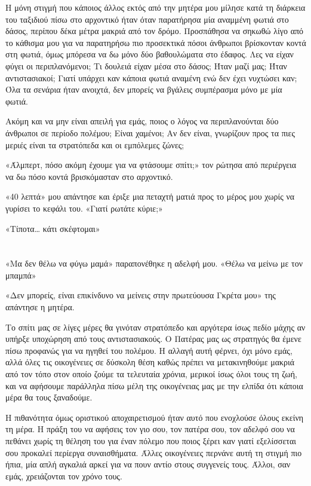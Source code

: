 \documentclass[12pt,twoside, openany]{book}
\begin{document}
Η μόνη στιγμή που κάποιος άλλος εκτός από την μητέρα μου μίλησε κατά τη διάρκεια του ταξιδιού πίσω στο αρχοντικό ήταν όταν παρατήρησα μία αναμμένη φωτιά στο δάσος, περίπου δέκα μέτρα μακριά από τον δρόμο. Προσπάθησα να σηκωθώ λίγο από το κάθισμα μου για να παρατηρήσω πιο προσεκτικά πόσοι άνθρωποι βρίσκονταν κοντά στη φωτιά, όμως μπόρεσα να δω μόνο δύο βαθουλώματα στο έδαφος. Λες να είχαν φύγει οι περιπλανόμενοι; Τι δουλειά είχαν μέσα στο δάσος; Ήταν μαζί μας; Ήταν αντιστασιακοί; Γιατί υπάρχει καν κάποια φωτιά αναμένη ενώ δεν έχει νυχτώσει καν; Όλα τα σενάρια ήταν ανοιχτά, δεν μπορείς να βγάλεις συμπέρασμα μόνο με μία φωτιά.

Ακόμη και να μην είναι απειλή για εμάς, ποιος ο λόγος να περιπλανούνται δύο άνθρωποι σε περίοδο πολέμου; Είναι χαμένοι; Αν δεν είναι, γνωρίζουν προς τα πιες μεριές είναι τα στρατόπεδα και οι εμπόλεμες ζώνες; 

«Άλμπερτ, πόσο ακόμη έχουμε για να φτάσουμε σπίτι;» τον ρώτησα από περιέργεια να δω πόσο κοντά βρισκόμασταν στο αρχοντικό.

«40 λεπτά» μου απάντησε και έριξε μια πεταχτή ματιά προς το μέρος μου χωρίς να γυρίσει το κεφάλι του. «Γιατί ρωτάτε κύριε;»

«Τίποτα… κάτι σκέφτομαι»


\chapter{}

«Μα δεν θέλω να φύγω μαμά» παραπονέθηκε η αδελφή μου. «Θέλω να μείνω με τον μπαμπά»

«Δεν μπορείς, είναι επικίνδυνο να μείνεις στην πρωτεύουσα Γκρέτα μου» της απάντησε η μητέρα.

Το σπίτι μας σε λίγες μέρες θα γινόταν στρατόπεδο και αργότερα ίσως πεδίο μάχης αν υπήρξε υποχώρηση από τους αντιστασιακούς. Ο Πατέρας μας ως στρατηγός θα έμενε πίσω προφανώς για να ηγηθεί του πολέμου. Η αλλαγή αυτή φέρνει, όχι μόνο εμάς, αλλά όλες τις οικογένειες σε δύσκολη θέση καθώς πρέπει να μετακινηθούμε μακριά από τον τόπο στον οποίο ζούμε τα τελευταία χρόνια, μερικοί ίσως όλοι τους τη ζωή, και να αφήσουμε παράλληλα πίσω μέλη της οικογένειας μας με την ελπίδα ότι κάποια μέρα θα τους ξαναδούμε.

Η πιθανότητα όμως οριστικού αποχαιρετισμού ήταν αυτό που ενοχλούσε όλους εκείνη τη μέρα. Η πράξη του να αφήσεις τον γιο σου, τον πατέρα σου, τον αδελφό σου να πεθάνει χωρίς τη θέληση του για έναν πόλεμο που ποιος ξέρει καν γιατί εξελίσσεται σου προκαλεί περίεργα συναισθήματα. Άλλες οικογένειες περνάνε αυτή τη στιγμή πιο ήπια, μία απλή αγκαλιά αρκεί για να πουν αντίο στους συγγενείς τους. Άλλοι, σαν εμάς, χρειάζονται τον χρόνο τους.
\end{document}
